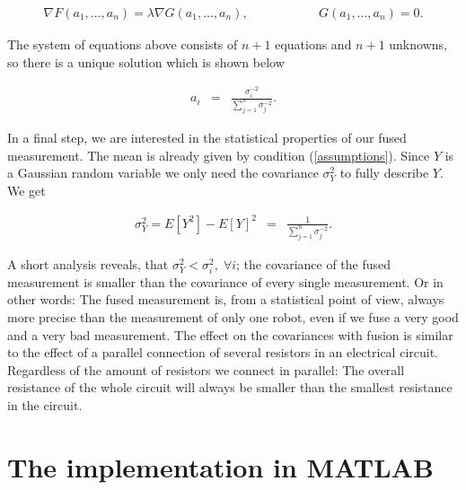 	\begin{eqnarray}\label{lagrange_multipliers}
    			 \nabla F(a_1,\ldots,a_n) = \lambda \nabla G(a_1,\ldots,a_n), \qquad && \qquad G(a_1,\ldots,a_n) = 0.
	\end{eqnarray}

The system of equations above consists of \(n+1\) equations and \(n+1\) unknowns, so there is a unique solution which is shown below

	\begin{eqnarray}\label{solution}
    			 a_i &=& \frac{\sigma_i^{-2}}{\sum_{j=1}^n \sigma_j^{-2}}.
	\end{eqnarray}

In a final step, we are interested in the statistical properties of our fused measurement. The mean is already given by condition (\ref{assumptions}). Since \(Y\) is a Gaussian random variable we only need the covariance \(\sigma_Y^2\) to fully describe \(Y\). We get

	\begin{eqnarray}\label{solution}
    			 \sigma_Y^2 = E\left[ Y^2 \right] - E[Y]^2 &=& \frac{1}{\sum_{j=1}^n \sigma_j^{-2}}.
	\end{eqnarray}

A short analysis reveals, that \(\sigma_Y^2 < \sigma_i^2, \; \forall i\); the covariance of the fused measurement is smaller than the covariance of every single measurement. Or in other words: The fused measurement is, from a statistical point of view, always more precise than the measurement of only one robot, even if we fuse a very good and a very bad measurement. The effect on the covariances with fusion is similar to the effect of a parallel connection of several resistors in an electrical circuit. Regardless of the amount of resistors we connect in parallel: The overall resistance of the whole circuit will always be smaller than the smallest resistance in the circuit.


\section{The implementation in MATLAB}

